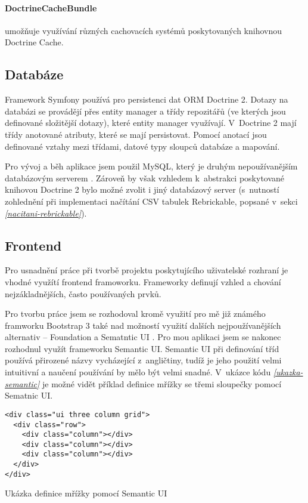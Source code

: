     \paragraph{DoctrineCacheBundle} 
    umožňuje využívání různých cachovacích systémů poskytovaných knihovnou Doctrine Cache. \autocite{doctrinecache}

\subsection{Databáze}
Framework Symfony používá pro persistenci dat \gls{ORM} Doctrine 2. Dotazy na databázi se provádějí přes entity manager a třídy
repozitářů (ve kterých jsou definované složitější dotazy), které entity manager využívají. V~Doctrine 2 mají třídy anotované atributy, které se mají persistovat. Pomocí anotací jsou definované vztahy mezi třídami, datové typy sloupců databáze a mapování.

Pro vývoj a běh aplikace jsem použil MySQL, který je druhým nepoužívanějším databázovým serverem \autocite{database-servers}. Zároveň by však vzhledem k~abstrakci poskytované knihovou Doctrine 2 bylo možné zvolit i jiný databázový server (s~nutností zohlednění při implementaci načítání CSV tabulek Rebrickable, popsané v~sekci \emph{\ref{nacitani-rebrickable}}).

\subsection{Frontend}
Pro usnadnění práce při tvorbě projektu poskytujícího uživatelské rozhraní je vhodné využítí frontend framoworku. Frameworky definují vzhled a chování nejzákladnějších, často používaných prvků. 

Pro tvorbu práce jsem se rozhodoval kromě využití pro mě již známého framworku Bootstrap 3 také nad možností využití dalších nejpoužívanějších alternativ – Foundation a Sematntic UI \autocite{web:frameworks}. Pro mou aplikaci jsem se nakonec rozhodnul využít frameworku Semantic UI. Semantic UI při definování tříd používá přirozené názvy vycházející z~angličtiny, tudíž je jeho použití velmi intuitivní a naučení používání by mělo být velmi snadné. V~ukázce kódu \emph{\ref{ukazka-semantic}} je možné vidět příklad definice mřížky se třemi sloupečky pomocí Sematnic UI.

\begin{listing}[htbp]
  \begin{verbatim}
<div class="ui three column grid">
  <div class="row">
    <div class="column"></div>
    <div class="column"></div>
    <div class="column"></div>
  </div>
</div>
    \end{verbatim}
  \caption{Ukázka definice mřížky pomocí Semantic UI\label{ukazka-semantic}}
\end{listing}
